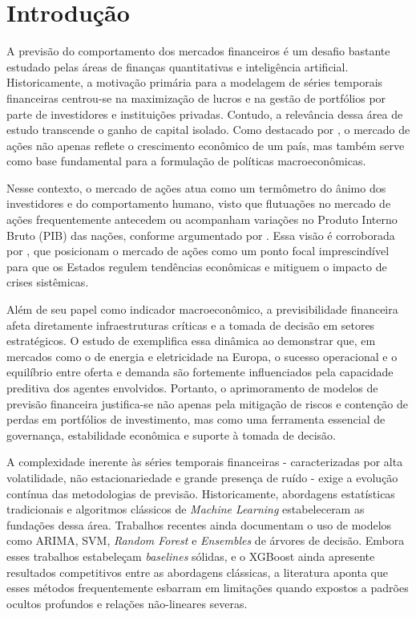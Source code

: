 \documentclass[12pt, a4paper, twoside]{article}
\begin{document}
\newpage

\section{Introdução}

A previsão do comportamento dos mercados financeiros é um desafio bastante estudado pelas áreas de finanças quantitativas e inteligência artificial. Historicamente, a motivação primária para a modelagem de séries temporais financeiras centrou-se na maximização de lucros e na gestão de portfólios por parte de investidores e instituições privadas. Contudo, a relevância dessa área de estudo transcende o ganho de capital isolado. Como destacado por , o mercado de ações não apenas reflete o crescimento econômico de um país, mas também serve como base fundamental para a formulação de políticas macroeconômicas.

Nesse contexto, o mercado de ações atua como um termômetro do ânimo dos investidores e do comportamento humano, visto que flutuações no mercado de ações frequentemente antecedem ou acompanham variações no Produto Interno Bruto (PIB) das nações, conforme argumentado por . Essa visão é corroborada por , que posicionam o mercado de ações como um ponto focal imprescindível para que os Estados regulem tendências econômicas e mitiguem o impacto de crises sistêmicas.

Além de seu papel como indicador macroeconômico, a previsibilidade financeira afeta diretamente infraestruturas críticas e a tomada de decisão em setores estratégicos. O estudo de  exemplifica essa dinâmica ao demonstrar que, em mercados como o de energia e eletricidade na Europa, o sucesso operacional e o equilíbrio entre oferta e demanda são fortemente influenciados pela capacidade preditiva dos agentes envolvidos. Portanto, o aprimoramento de modelos de previsão financeira justifica-se não apenas pela mitigação de riscos e contenção de perdas em portfólios de investimento, mas como uma ferramenta essencial de governança, estabilidade econômica e suporte à tomada de decisão.

A complexidade inerente às séries temporais financeiras - caracterizadas por alta volatilidade, não estacionariedade e grande presença de ruído - exige a evolução contínua das metodologias de previsão. Historicamente, abordagens estatísticas tradicionais e algoritmos clássicos de \textit{Machine Learning} estabeleceram as fundações dessa área. Trabalhos recentes \cite{mahjouby_predicting_2024, sharma_stock_2023} ainda documentam o uso de modelos como ARIMA, SVM, \textit{Random Forest} e \textit{Ensembles} de árvores de decisão. Embora esses trabalhos estabeleçam \textit{baselines} sólidas, e o XGBoost ainda apresente resultados competitivos entre as abordagens clássicas, a literatura aponta que esses métodos frequentemente esbarram em limitações quando expostos a padrões ocultos profundos e relações não-lineares severas.
\end{document}
